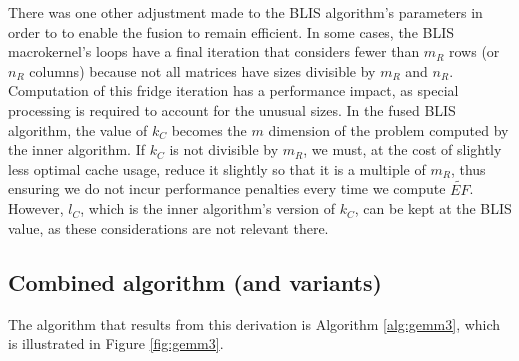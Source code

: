 \documentclass[12pt]{article}
\begin{document}
There was one other adjustment made to the BLIS algorithm's parameters in order to to enable the fusion to remain efficient.
In some cases, the BLIS macrokernel's loops have a final iteration that considers fewer than $m_R$ rows (or $n_R$ columns) because not all matrices have sizes divisible by $m_R$ and $n_R$.
Computation of this fridge iteration has a performance impact, as special processing is required to account for the unusual sizes.
In the fused BLIS algorithm, the value of $k_C$ becomes the $m$ dimension of the problem computed by the inner algorithm.
If $k_C$ is not divisible by $m_R$, we must, at the cost of slightly less optimal cache usage, reduce it slightly so that it is a multiple of $m_R$, thus ensuring we do not incur performance penalties every time we compute $\widetilde{EF}$.
However, $l_C$, which is the inner algorithm's version of $k_C$, can be kept at the BLIS value, as these considerations are not relevant there.

\subsection{Combined algorithm (and variants)}
The algorithm that results from this derivation is Algorithm \ref{alg:gemm3}, which is illustrated in Figure \ref{fig:gemm3}.
\end{document}
